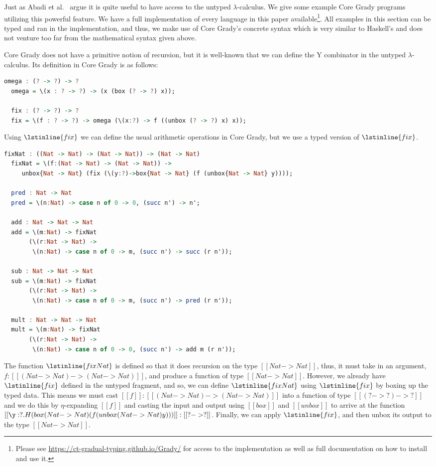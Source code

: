 Just as Abadi et al.~\cite{Abadi:1989} argue it is quite useful to
have access to the untyped $\lambda$-calculus.  We give some example
Core Grady programs utilizing this powerful feature.  We have a full
implementation of every language in this paper
available\footnote{Please see
  \url{https://ct-gradual-typing.github.io/Grady/} for access to the
  implementation as well as full documentation on how to install and
  use it.}.  All examples in this section can be typed and ran in the
implementation, and thus, we make use of Core Grady's concrete syntax
which is very similar to Haskell's and does not venture too far from
the mathematical syntax given above.

Core Grady does not have a primitive notion of recursion, but it is
well-known that we can define the Y combinator in the untyped
$\lambda$-calculus.  Its definition in Core Grady is as follows:
\begin{lstlisting}[language=Haskell]
  omega : (? -> ?) -> ?
  omega = \(x : ? -> ?) -> (x (box (? -> ?) x));
  
  fix : (? -> ?) -> ?
  fix = \(f : ? -> ?) -> omega (\(x:?) -> f ((unbox (? -> ?) x) x));
\end{lstlisting}
Using $\lstinline{fix}$ we can define the usual arithmetic operations
in Core Grady, but we use a typed version of $\lstinline{fix}$.
\begin{lstlisting}[language=Haskell]
  fixNat : ((Nat -> Nat) -> (Nat -> Nat)) -> (Nat -> Nat)
  fixNat = \(f:(Nat -> Nat) -> (Nat -> Nat)) ->
     unbox{Nat -> Nat} (fix (\(y:?)->box{Nat -> Nat} (f (unbox{Nat -> Nat} y))));
  
  pred : Nat -> Nat
  pred = \(n:Nat) -> case n of 0 -> 0, (succ n') -> n';

  add : Nat -> Nat -> Nat
  add = \(m:Nat) -> fixNat
       (\(r:Nat -> Nat) ->
        \(n:Nat) -> case n of 0 -> m, (succ n') -> succ (r n'));

  sub : Nat -> Nat -> Nat
  sub = \(m:Nat) -> fixNat
       (\(r:Nat -> Nat) ->
        \(n:Nat) -> case n of 0 -> m, (succ n') -> pred (r n'));        
        
  mult : Nat -> Nat -> Nat
  mult = \(m:Nat) -> fixNat
       (\(r:Nat -> Nat) ->
        \(n:Nat) -> case n of 0 -> 0, (succ n') -> add m (r n'));
\end{lstlisting}
The function $\lstinline{fixNat}$ is defined so that it does recursion
on the type $[[Nat -> Nat]]$, thus, it must take in an argument,
$f : [[(Nat -> Nat) -> (Nat -> Nat)]]$, and
produce a function of type $[[Nat -> Nat]]$.  However, we
already have $\lstinline{fix}$ defined in the untyped fragment, and
so, we can define $\lstinline{fixNat}$ using $\lstinline{fix}$ by
boxing up the typed data.  This means we must cast $[[f]] : [[(Nat -> Nat) -> (Nat -> Nat)]]$ into a function of type
$[[(? -> ?) -> ?]]$ and we do this by $\eta$-expanding
$[[f]]$ and casting the input and output using $[[box]]$ and
$[[unbox]]$ to arrive at the function
$[[\y:?.H(box (Nat -> Nat) (f (unbox (Nat -> Nat) y)))]] : [[? -> ?]]$.  Finally, we can apply $\lstinline{fix}$, and then unbox its output to the type $[[Nat -> Nat]]$.

